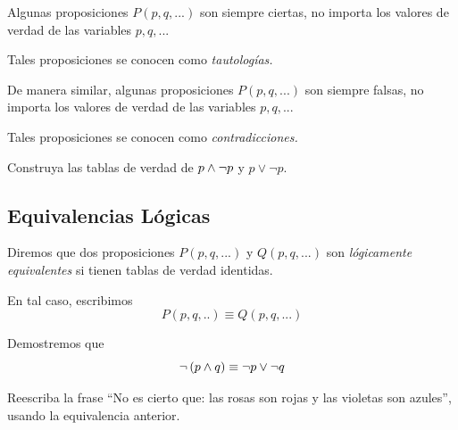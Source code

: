 \documentclass[xcolor={svgnames},
  hyperref={colorlinks}, 
  spanish, 12pt]{beamer}
\numberwithin{equation}{section} %
\numberwithin{figure}{section} %
\begin{document}
\begin{frame}
 Algunas proposiciones $P(p,q,...)$ son siempre ciertas, no importa los valores de verdad de las variables $p,q,...$ 
 \pause 
 
 Tales proposiciones se conocen como \emph{tautolog\'ias.}
\end{frame}

\begin{frame}
 De manera similar, algunas proposiciones $P(p,q,...)$ son siempre falsas, no importa los valores de verdad de las variables $p,q,...$ 
 \pause 
 
 Tales proposiciones se conocen como \emph{contradicciones.}
\end{frame}

\begin{frame}
 \begin{exmp}
  Construya las tablas de verdad de $p \wedge \neg p$ y $p \vee \neg p.$
 \end{exmp}

\end{frame}

\subsection{Equivalencias L\'ogicas}

\begin{frame}
 Diremos que dos proposiciones $P(p,q,...)$ y $Q(p,q,...)$ son \emph{l\'ogicamente equivalentes} si tienen tablas de verdad identidas. 
 \pause
 
 En tal caso, escribimos $$P(p,q,..)\equiv Q(p,q,...)$$
\end{frame}

\begin{frame}
 \begin{exmp} Demostremos que 
  $$
  \neg\left( p \wedge q \right) \equiv \neg p \vee \neg q
  $$
 \end{exmp}

\end{frame}

\begin{frame}
 \begin{exmp}
  Reescriba la frase ``No es cierto que: las rosas son rojas y las violetas son azules'', usando la equivalencia anterior.
 \end{exmp}

\end{frame}

\end{document}
